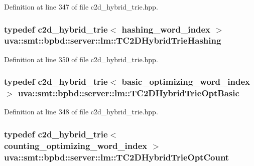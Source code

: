 Definition at line 347 of file c2d\+\_\+hybrid\+\_\+trie.\+hpp.

\hypertarget{namespaceuva_1_1smt_1_1bpbd_1_1server_1_1lm_af93f666e7d0833493d6cb5993a58247d}{}
\subsubsection[{T\+C2\+D\+Hybrid\+Trie\+Hashing}]{\setlength{\rightskip}{0pt plus 5cm}typedef {\bf c2d\+\_\+hybrid\+\_\+trie}$<$ {\bf hashing\+\_\+word\+\_\+index} $>$ {\bf uva\+::smt\+::bpbd\+::server\+::lm\+::\+T\+C2\+D\+Hybrid\+Trie\+Hashing}}\label{namespaceuva_1_1smt_1_1bpbd_1_1server_1_1lm_af93f666e7d0833493d6cb5993a58247d}


Definition at line 350 of file c2d\+\_\+hybrid\+\_\+trie.\+hpp.

\hypertarget{namespaceuva_1_1smt_1_1bpbd_1_1server_1_1lm_abffc9eb1eef6c2764ec48dc9044f2519}{}
\subsubsection[{T\+C2\+D\+Hybrid\+Trie\+Opt\+Basic}]{\setlength{\rightskip}{0pt plus 5cm}typedef {\bf c2d\+\_\+hybrid\+\_\+trie}$<$ {\bf basic\+\_\+optimizing\+\_\+word\+\_\+index} $>$ {\bf uva\+::smt\+::bpbd\+::server\+::lm\+::\+T\+C2\+D\+Hybrid\+Trie\+Opt\+Basic}}\label{namespaceuva_1_1smt_1_1bpbd_1_1server_1_1lm_abffc9eb1eef6c2764ec48dc9044f2519}


Definition at line 348 of file c2d\+\_\+hybrid\+\_\+trie.\+hpp.

\hypertarget{namespaceuva_1_1smt_1_1bpbd_1_1server_1_1lm_ad6272a176cac7528701a115cc68a485c}{}
\subsubsection[{T\+C2\+D\+Hybrid\+Trie\+Opt\+Count}]{\setlength{\rightskip}{0pt plus 5cm}typedef {\bf c2d\+\_\+hybrid\+\_\+trie}$<$ {\bf counting\+\_\+optimizing\+\_\+word\+\_\+index} $>$ {\bf uva\+::smt\+::bpbd\+::server\+::lm\+::\+T\+C2\+D\+Hybrid\+Trie\+Opt\+Count}}\label{namespaceuva_1_1smt_1_1bpbd_1_1server_1_1lm_ad6272a176cac7528701a115cc68a485c}


